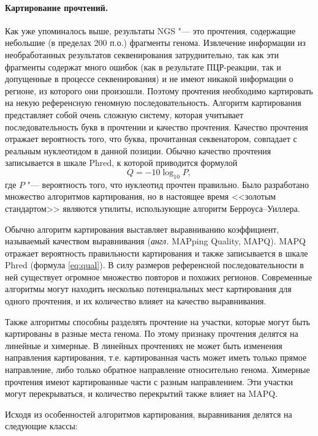 \documentclass[a4paper,12pt]{article}
\begin{document}
\paragraph{Картирование прочтений.}
Как уже упоминалось выше, результаты NGS "--- это прочтения, содержащие небольшие (в пределах 200 п.о.) фрагменты генома.
Извлечение информации из необработанных результатов секвенирования затруднительно, так как эти фрагменты содержат много ошибок (как в результате ПЦР-реакции, так и допущенные в процессе секвенирования) и не имеют никакой информации о регионе, из которого они произошли.
Поэтому прочтения необходимо картировать на некую референсную геномную последовательность.
Алгоритм картирования представляет собой очень сложную систему, которая учитывает последовательность букв в прочтении и качество прочтения.
Качество прочтения отражает вероятность того, что буква, прочитанная секвенатором, совпадает с реальным нуклеотидом в данной позиции.
Обычно качество прочтения записывается в шкале Phred, к которой приводится формулой \begin{equation}Q = -10\log_{10}P,\label{eq:qual}\end{equation} где $P$ "--- вероятность того, что нуклеотид прочтен правильно.
Было разработано множество алгоритмов картирования, но в настоящее время <<золотым стандартом>> являются утилиты, использующие алгоритм Берроуса--Уиллера\cite{Burrows_1994}.

Обычно алгоритм картирования выставляет выравниванию коэффициент, называемый качеством выравнивания (\textit{англ.} MAPping Quality, MAPQ).
MAPQ отражает вероятность правильности картирования и также записывается в шкале Phred (формула \ref{eq:qual}).
В силу размеров референсной последовательности в ней существует огромное множество повторов и похожих регионов.
Современные алгоритмы могут находить несколько потенциальных мест картирования для одного прочтения, и их количество влияет на качество выравнивания.

Также алгоритмы способны разделять прочтение на участки, которые могут быть картированы в разные места генома.
По этому признаку прочтения делятся на линейные и химерные.
В линейных прочтениях не может быть изменения направления картирования, т.е. картированная часть может иметь только прямое направление, либо только обратное направление относительно генома.
Химерные прочтения имеют картированные части с разным направлением.
Эти участки могут перекрываться, и количество перекрытий также влияет на MAPQ.

Исходя из особенностей алгоритмов картирования, выравнивания делятся на следующие классы:
\end{document}
